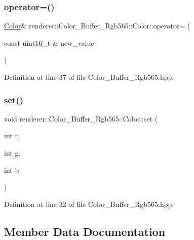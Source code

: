\subsubsection{\texorpdfstring{operator=()}{operator=()}}
{\footnotesize\ttfamily \mbox{\hyperlink{structrenderer_1_1_color___buffer___rgb565_1_1_color}{Color}}\& renderer\+::\+Color\+\_\+\+Buffer\+\_\+\+Rgb565\+::\+Color\+::operator= (\begin{DoxyParamCaption}\item[{const uint16\+\_\+t \&}]{new\+\_\+value }\end{DoxyParamCaption})\hspace{0.3cm}{\ttfamily [inline]}}



Definition at line 37 of file Color\+\_\+\+Buffer\+\_\+\+Rgb565.\+hpp.

\mbox{\label{structrenderer_1_1_color___buffer___rgb565_1_1_color_a9b751a4c9af850c41602fef7afc67440}} 
\subsubsection{\texorpdfstring{set()}{set()}}
{\footnotesize\ttfamily void renderer\+::\+Color\+\_\+\+Buffer\+\_\+\+Rgb565\+::\+Color\+::set (\begin{DoxyParamCaption}\item[{int}]{r,  }\item[{int}]{g,  }\item[{int}]{b }\end{DoxyParamCaption})\hspace{0.3cm}{\ttfamily [inline]}}



Definition at line 32 of file Color\+\_\+\+Buffer\+\_\+\+Rgb565.\+hpp.



\subsection{Member Data Documentation}
\mbox{\label{structrenderer_1_1_color___buffer___rgb565_1_1_color_a392aacf0da0ba11ef240e66a55816971}} 
